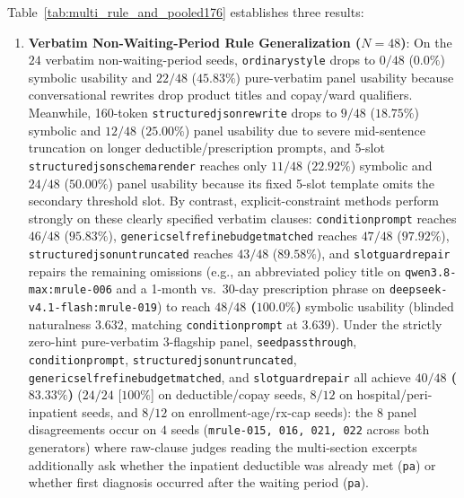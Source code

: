 \documentclass[10pt,twocolumn]{article}
\renewcommand{\_}{\textunderscore\allowbreak}
\begin{document}
Table~\ref{tab:multi_rule_and_pooled176} establishes three results:
\begin{enumerate}[leftmargin=*,nosep]
  \item \textbf{Verbatim Non-Waiting-Period Rule Generalization ($N=48$)}: On the $24$ verbatim non-waiting-period seeds, \texttt{ordinary\_style} drops to $0/48$ ($0.0\%$) symbolic usability and $22/48$ ($45.83\%$) pure-verbatim panel usability because conversational rewrites drop product titles and copay/ward qualifiers. Meanwhile, 160-token \texttt{structured\_json\_rewrite} drops to $9/48$ ($18.75\%$) symbolic and $12/48$ ($25.00\%$) panel usability due to severe mid-sentence truncation on longer deductible/prescription prompts, and 5-slot \texttt{structured\_json\_schema\_render} reaches only $11/48$ ($22.92\%$) symbolic and $24/48$ ($50.00\%$) panel usability because its fixed 5-slot template omits the secondary threshold slot. By contrast, explicit-constraint methods perform strongly on these clearly specified verbatim clauses: \texttt{condition\_prompt} reaches $46/48$ ($95.83\%$), \texttt{generic\_self\_refine\_budget\_matched} reaches $47/48$ ($97.92\%$), \texttt{structured\_json\_untruncated\_320} reaches $43/48$ ($89.58\%$), and \texttt{slot\_guard\_repair} repairs the remaining omissions (e.g., an abbreviated policy title on \texttt{qwen3.8-max:mrule-006} and a 1-month vs.\ 30-day prescription phrase on \texttt{deepseek-v4.1-flash:mrule-019}) to reach \textbf{$48/48$ ($100.0\%$)} symbolic usability (blinded naturalness $3.632$, matching \texttt{condition\_prompt} at $3.639$). Under the strictly zero-hint pure-verbatim 3-flagship panel, \texttt{seed\_passthrough}, \texttt{condition\_prompt}, \texttt{structured\_json\_untruncated\_320}, \texttt{generic\_self\_refine\_budget\_matched}, and \texttt{slot\_guard\_repair} all achieve \textbf{$40/48$ ($83.33\%$)} ($24/24$ [$100\%$] on deductible/copay seeds, $8/12$ on hospital/peri-inpatient seeds, and $8/12$ on enrollment-age/rx-cap seeds): the $8$ panel disagreements occur on $4$ seeds (\texttt{mrule-015, 016, 021, 022} across both generators) where raw-clause judges reading the multi-section excerpts additionally ask whether the inpatient deductible was already met (\texttt{pa\_2650}) or whether first diagnosis occurred after the waiting period (\texttt{pa\_1073}).

\end{enumerate}
\end{document}
